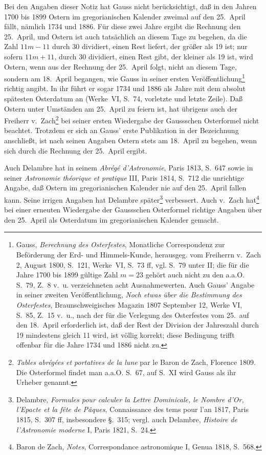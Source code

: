 \documentclass[12pt,a4paper]{article}
\theoremstyle{plain}
\theoremstyle{definition}
\theoremstyle{remark}
\begin{document}
Bei den Angaben dieser Notiz hat Gauss nicht berücksichtigt, daß in den Jahren 1700 bis 1899 Ostern im gregorianischen Kalender zweimal auf den 25.~April fällt, nämlich 1734 und 1886. Für diese zwei Jahre ergibt die Rechnung den 25.~April, und Ostern ist auch tatsächlich an diesem Tage zu begehen, da die Zahl $11m - 11$ durch 30 dividiert, einen Rest liefert, der größer als 19 ist; nur sofern $11m + 11$, durch 30 dividiert, einen Rest gibt, der kleiner als 19 ist, wird Ostern, wenn aus der Rechnung der 25.~April folgt, nicht an diesem Tage, sondern am 18.~April begangen, wie Gauss in seiner ersten Veröffentlichung\footnote{Gauss, \textit{Berechnung des Osterfestes}, Monatliche Correspondenz zur Beförderung der Erd- und Himmels-Kunde, herausgeg. vom Freiherrn v.~Zach 2, August 1800, S.~121, Werke~VI, S.~73 ff, vgl. S.~79 unter II; die für die Jahre 1700 bis 1899 gültige Zahl $m = 23$ gehört auch nicht zu den a.a.O. S.~79, Z.~8 v.~u. verzeichneten acht Ausnahmewerten. Auch Gauss' Angabe in seiner zweiten Veröffentlichung, \textit{Noch etwas über die Bestimmung des Osterfestes}, Braunschweigisches Magazin 1807 September 12, Werke VI, S.~85, Z.~15 v.~u., nach der für die Verlegung des Osterfestes vom 25.~auf den 18.~April erforderlich ist, daß der Rest der Division der Jahreszahl durch 19 mindestens gleich 11 wird, ist völlig korrekt; diese Bedingung trifft offenbar für die Jahre 1734 und 1886 nicht zu.} richtig angibt. In ihr führt er sogar 1734 und 1886 als Jahre mit dem absolut spätesten Osterdatum an (Werke~VI, S.~74, vorletzte und letzte Zeile). Daß Ostern unter Umständen am 25.~April zu feiern ist, hat übrigens auch der Freiherr v.~Zach\footnote{\textit{Tables abrégées et portatives de la lune} par le Baron de Zach, Florence 1809. Die Osterformel findet man a.a.O. S.~67, auf S.~XI wird Gauss als ihr Urheber genannt.} bei seiner ersten Wiedergabe der Gaussschen Osterformel nicht beachtet. Trotzdem er sich an Gauss' erste Publikation in der Bezeichnung anschließt, ist nach seinen Angaben Ostern stets am 18.~April zu begehen, wenn sich durch die Rechnung der 25.~April ergibt.

Auch Delambre hat in seinem \textit{Abrégé d'Astronomie}, Paris 1813, S.~647 sowie in seiner \textit{Astronomie théorique et pratique} III, Paris 1814, S.~712 die unrichtige Angabe, daß Ostern im gregorianischen Kalender nie auf den 25.~April fallen kann. Seine irrigen Angaben hat Delambre später\footnote{Delambre, \textit{Formules pour calculer la Lettre Dominicale, le Nombre d'Or, l'Epacte et la fête de Pâques}, Connaissance des tems pour l'an 1817, Paris 1815, S.~307 ff, insbesondere §.~315; vergl. auch Delambre, \textit{Histoire de l'Astronomie moderne} I, Paris 1821, S.~24.} verbessert. Auch v.~Zach hat\footnote{Baron de Zach, \textit{Notes}, Correspondance astronomique I, Genua 1818, S.~568.} bei einer erneuten Wiedergabe der Gaussschen Osterformel richtige Angaben über den 25.~April als Osterdatum im gregorianischen Kalender gemacht.
\end{document}
